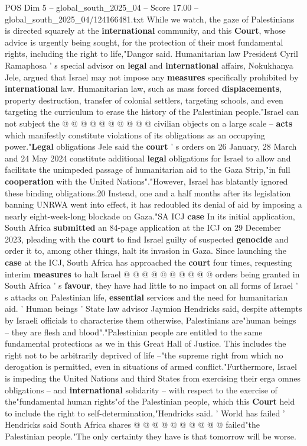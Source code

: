\begin{textsample}{POS Dim 5 – global\_south\_2025\_04 – Score 17.00 – global\_south\_2025\_04/124166481.txt}
While we watch, the gaze of Palestinians is directed squarely at the \textbf{international} community, and this \textbf{Court}, whose advice is urgently being sought, for the protection of their most fundamental rights, including the right to life,"Dangor said.
Humanitarian law President Cyril Ramaphosa ' s special advisor on \textbf{legal} and \textbf{international} affairs, Nokukhanya Jele, argued that Israel may not impose any \textbf{measures} specifically prohibited by \textbf{international} law.
Humanitarian law, such as mass forced \textbf{displacements}, property destruction, transfer of colonial settlers, targeting schools, and even targeting the curriculum to erase the history of the Palestinian people."Israel can not subject the @ @ @ @ @ @ @ @ @ @ civilian objects on a large scale -- \textbf{acts} which manifestly constitute violations of its obligations as an occupying power."\textbf{Legal} obligations Jele said the \textbf{court} ' s orders on 26 January, 28 March and 24 May 2024 constitute additional \textbf{legal} obligations for Israel to allow and facilitate the unimpeded passage of humanitarian aid to the Gaza Strip,"in full \textbf{cooperation} with the United Nations"."However, Israel has blatantly ignored these binding obligations.20 Instead, one and a half months after its legislation banning UNRWA went into effect, it has redoubled its denial of aid by imposing a nearly eight-week-long blockade on Gaza."SA ICJ \textbf{case} In its initial application, South Africa \textbf{submitted} an 84-page application at the ICJ on 29 December 2023, pleading with the \textbf{court} to find Israel guilty of suspected \textbf{genocide} and order it to, among other things, halt its invasion in Gaza.
Since launching the \textbf{case} at the ICJ, South Africa has approached the \textbf{court} four times, requesting interim \textbf{measures} to halt Israel @ @ @ @ @ @ @ @ @ @ orders being granted in South Africa ' s \textbf{favour}, they have had little to no impact on all forms of Israel ' s attacks on Palestinian life, \textbf{essential} services and the need for humanitarian aid. ' Human beings ' State law advisor Jaymion Hendricks said, despite attempts by Israeli officials to characterise them otherwise, Palestinians are"human beings -- they are flesh and blood"."Palestinian people are entitled to the same fundamental protections as we in this Great Hall of Justice.
This includes the right not to be arbitrarily deprived of life --"the supreme right from which no derogation is permitted, even in situations of armed conflict."Furthermore, Israel is impeding the United Nations and third States from exercising their erga omnes obligations -- and \textbf{international} solidarity -- with respect to the exercise of the"fundamental human rights"of the Palestinian people, which this \textbf{Court} held to include the right to self-determination,"Hendricks said. ' World has failed ' Hendricks said South Africa shares @ @ @ @ @ @ @ @ @ @ failed"the Palestinian people."The only certainty they have is that tomorrow will be worse.

\end{textsample}
